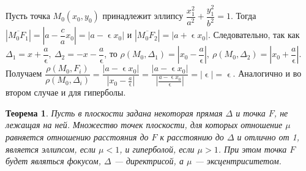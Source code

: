 \begin{Proof}
	Пусть точка $M_0(x_0, y_0)$ принадлежит эллипсу $\dfrac{x_1^2}{a^2} + \dfrac{y_1^2}{b^2} = 1$. Тогда $|\overline{M_0F_1}| = |a - \dfrac{c}{a}x_0| = |a - \upvarepsilon x_0|$ и $|\overline{M_0F_2}| = |a + \upvarepsilon x_0|$. Следовательно, так как $\Delta_1 = x + \dfrac{a}{\upvarepsilon},\ \Delta_2 = -x - \dfrac{a}{\upvarepsilon}$, то $\rho (M_0, \Delta_1) = |x_0 -\dfrac{a}{\upvarepsilon}|,\ \rho(M_0,\Delta_2) = |x_0 +\dfrac{a}{\upvarepsilon}|$. Получаем $\dfrac{\rho(M_0, F_i)}{\rho(M_0, \Delta_i)} = \dfrac{|a-\upvarepsilon x_0|}{|x_0 - \frac{a}{\upvarepsilon}|} =\dfrac{|a-\upvarepsilon x_0|}{|\frac{a - \upvarepsilon x_0}{\upvarepsilon}|} = |\upvarepsilon| = \upvarepsilon$. Аналогично и во втором случае и для гиперболы.
\end{Proof}
\newtheorem*{th3_1_2}{Теорема}\begin{th3_1_2}
	Пусть в плоскости задана некоторая прямая $\Delta$ и точка $F$, не лежащая на ней. Множество
	точек плоскости, для которых отношение $\mu$ равняется отношению расстояния до $F$ к расстоянию до $\Delta$
	и отлично от 1, является эллипсом, если $\mu < 1$, и гиперболой, если $\mu > 1$. При этом точка $F$ будет
	являться фокусом, $\Delta$ --- директрисой, а $\mu$ --- эксцентриситетом.
\end{th3_1_2}
